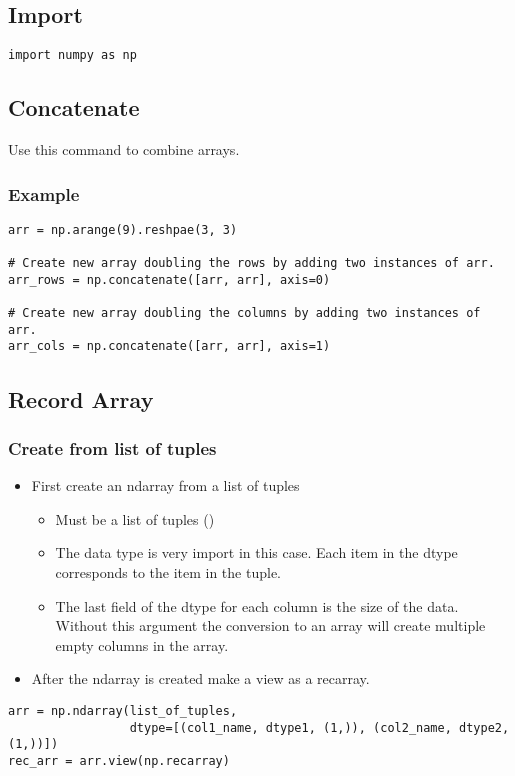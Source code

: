 \subsection{Import}
\begin{lstlisting}
import numpy as np
\end{lstlisting}

\subsection{Concatenate}
Use this command to combine arrays.
%
\subsubsection{Example}
\begin{lstlisting}
arr = np.arange(9).reshpae(3, 3)

# Create new array doubling the rows by adding two instances of arr.
arr_rows = np.concatenate([arr, arr], axis=0)

# Create new array doubling the columns by adding two instances of arr.
arr_cols = np.concatenate([arr, arr], axis=1)
\end{lstlisting}


\subsection{Record Array}
%
\subsubsection{Create from list of tuples}
\begin{itemize}
  \item First create an ndarray from a list of tuples
    \begin{itemize}
      \item Must be a list of tuples
        ({\color{red}{list of lists will not work}})
      \item The data type is very import in this case. Each item in the dtype
        corresponds to the item in the tuple.
      \item The last field of the dtype for each column is the size of the data.
        Without this argument the conversion to an array will create multiple
        empty columns in the array.
    \end{itemize}
  \item After the ndarray is created make a view as a recarray.
\end{itemize}
\begin{lstlisting}[basicstyle=\bfseries\footnotesize]
arr = np.ndarray(list_of_tuples,
                 dtype=[(col1_name, dtype1, (1,)), (col2_name, dtype2, (1,))])
rec_arr = arr.view(np.recarray)
\end{lstlisting}
